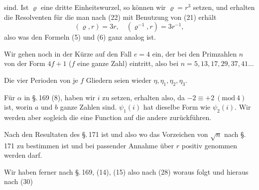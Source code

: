 sind. Ist $\varrho$ eine dritte Einheitswurzel, so können wir $\varrho = r^3$
setzen, und erhalten die Resolventen
für die man nach (22) mit Benutzung von (21) erhält
\[
(\varrho, r) = 3r, \quad (\varrho^{-1}, r) = 3r^{-1},
\]
also
was den Formeln (5) und (6) ganz analog ist.

Wir gehen noch in der Kürze auf den Fall $e = 4$ ein, der
bei den Primzahlen $n$ von der Form $4f + 1$ ($f$ eine ganze Zahl)
eintritt, also bei $n = 5, 13, 17, 29, 37, 41 \dots$

Die vier Perioden von je $f$ Gliedern seien wieder $\eta, \eta_1, \eta_2, \eta_3$.

Für $\alpha$ in \S.\,169 (8), haben wir $i$ zu setzen, erhalten also,
da $-2 \equiv +2\ (\mathrm{mod}\ 4)$ ist,
worin $a$ und $b$ ganze Zahlen sind. $\psi_1(i)$ hat dieselbe Form
wie $\psi_2(i)$. Wir werden aber sogleich die eine Function auf die
andere zurückführen.

Nach den Resultaten des \S.\,171 ist
und also
wo das Vorzeichen von $\sqrt{n}$ nach \S.\,171 zu bestimmen ist und
bei passender Annahme über $r$ positiv genommen werden darf.

Wir haben ferner nach \S.\,169, (14), (15)
also nach (28)
woraus folgt
und hieraus nach (30)
